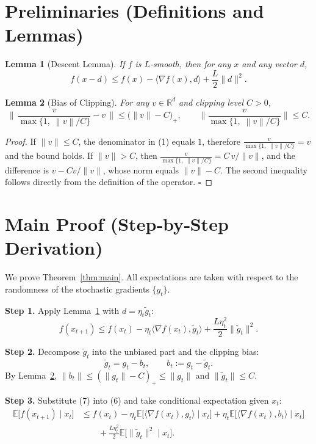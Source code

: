 \documentclass{article}
\newtheorem{lemma}{Lemma}
\newcommand{\E}{\mathbb{E}}
\newcommand{\R}{\mathbb{R}}
\newcommand{\norm}[1]{\left\|#1\right\|}
\newcommand{\clip}[2]{\frac{#1}{\max\{1,\; \norm{#1}/#2\}}}
\begin{document}
\newpage

\section*{Preliminaries (Definitions and Lemmas)}
\begin{lemma}[Descent Lemma]
\label{lem:descent}
If $f$ is $L$‑smooth, then for any $x$ and any vector $d$,
\[
f(x-d)\le f(x)-\langle\nabla f(x),d\rangle+\frac{L}{2}\|d\|^{2}.
\tag{4}
\]
\end{lemma}

\begin{lemma}[Bias of Clipping]
\label{lem:bias}
For any $v\in\R^{d}$ and clipping level $C>0$,
\[
\bigl\|\,\clip{v}{C}-v\,\bigr\|\le \bigl(\|v\|-C\bigr)_{+},
\qquad 
\bigl\|\clip{v}{C}\bigr\|\le C.
\tag{5}
\]
\end{lemma}
\begin{proof}
If $\|v\|\le C$, the denominator in (1) equals $1$, therefore $\clip{v}{C}=v$ and the bound holds.
If $\|v\|>C$, then $\clip{v}{C}=C\,v/\|v\|$, and the difference is $v-Cv/\|v\|$, whose norm equals $\|v\|-C$. The second inequality follows directly from the definition of the operator. \hfill $\square$
\end{proof}

\section*{Main Proof (Step‑by‑Step Derivation)}
We prove Theorem~\ref{thm:main}. All expectations are taken with respect to the randomness of the stochastic gradients $\{g_t\}$.

\noindent\textbf{Step 1.} Apply Lemma~\ref{lem:descent} with $d=\eta_t\tilde g_t$:
\[
f(x_{t+1})\le f(x_t)-\eta_t\langle\nabla f(x_t),\tilde g_t\rangle
                +\frac{L\eta_t^{2}}{2}\|\tilde g_t\|^{2}.
\tag{6}
\]

\noindent\textbf{Step 2.} Decompose $\tilde g_t$ into the unbiased part and the clipping bias:
\[
\tilde g_t = g_t - b_t,\qquad 
b_t:=g_t-\tilde g_t.
\tag{7}
\]
By Lemma~\ref{lem:bias}, $\|b_t\|\le (\|g_t\|-C)_{+}\le\|g_t\|$ and $\|\tilde g_t\|\le C$.

\noindent\textbf{Step 3.} Substitute (7) into (6) and take conditional expectation given $x_t$:
\[
\begin{aligned}
\E\!\bigl[f(x_{t+1})\mid x_t\bigr]
&\le f(x_t)-\eta_t\E\!\bigl[\langle\nabla f(x_t),g_t\rangle\mid x_t\bigr]
      +\eta_t\E\!\bigl[\langle\nabla f(x_t),b_t\rangle\mid x_t\bigr] \\
&\qquad +\frac{L\eta_t^{2}}{2}\E\!\bigl[\|\tilde g_t\|^{2}\mid x_t\bigr].
\end{aligned}
\tag{8}
\]
\end{document}
